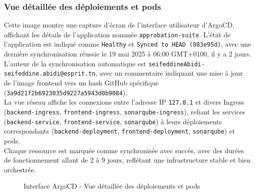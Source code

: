 \subsubsection{Vue détaillée des déploiements et pods}
Cette image montre une capture d’écran de l’interface utilisateur d’ArgoCD, affichant les détails de l’application nommée \texttt{approbation-suite}. L’état de l’application est indiqué comme \texttt{Healthy} et \texttt{Synced to HEAD (083e95d)}, avec une dernière synchronisation réussie le 19 mai 2025 à 06:00 GMT+0100, il y a 2 jours. \\L’auteur de la synchronisation automatique est \texttt{seifeddineAbidi-seifeddine.abidi@esprit.tn}, avec un commentaire indiquant une mise à jour de l’image frontend vers un hash GitHub spécifique (\texttt{3a9d21f2b6923035d9227a5943d0b9084}).\\La vue réseau affiche les connexions entre l’adresse IP \texttt{127.0.1} et divers Ingress (\texttt{backend-ingress}, \texttt{frontend-ingress}, \texttt{sonarqube-ingress}), reliant les services (\texttt{backend-service}, \texttt{frontend-service}, \texttt{sonarqube}) à leurs déploiements correspondants (\texttt{backend-deployment}, \texttt{frontend-deployment}, \texttt{sonarqube}) et pods.\\Chaque ressource est marquée comme synchronisée avec succès, avec des durées de fonctionnement allant de 2 à 9 jours, reflétant une infrastructure stable et bien orchestrée.
\begin{figure}[h]
    \begin{adjustwidth}{-3.5cm}{-3.5cm}
    \centering
    \caption{Interface ArgoCD - Vue détaillée des déploiements et pods}
    \label{fig:argo3}
    \end{adjustwidth}
\end{figure}
